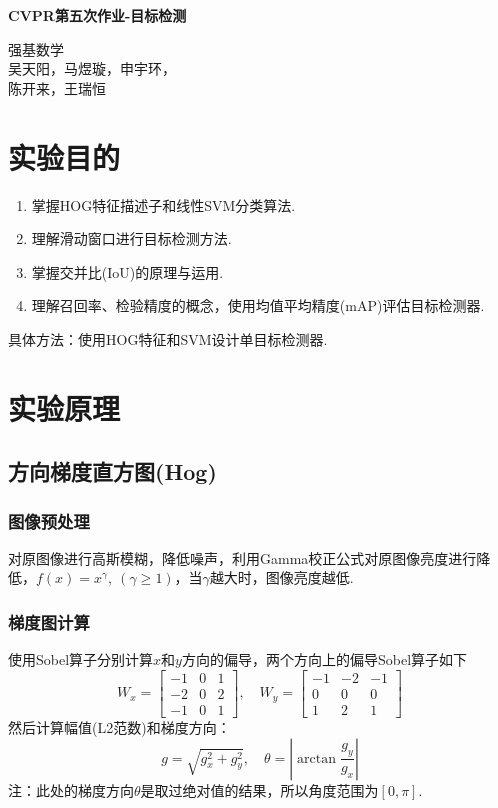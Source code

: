 \documentclass[12pt, a4paper, oneside]{ctexart}
\numberwithin{equation}{section}  %
\newenvironment{myTitle}[1]{
    \begin{center}
    {\zihao{-2}\bf #1\\}
    \zihao{-4}\it
}{\end{center}}  %
\let\geq=\geqslant %
\begin{document}
\begin{myTitle}{CVPR第五次作业-目标检测}
    强基数学\\
    吴天阳，马煜璇，申宇环，\\
    陈开来，王瑞恒
\end{myTitle}
\section{实验目的}
\begin{enumerate}
  \item 掌握HOG特征描述子和线性SVM分类算法.
  \item 理解滑动窗口进行目标检测方法.
  \item 掌握交并比(IoU)的原理与运用.
  \item 理解召回率、检验精度的概念，使用均值平均精度(mAP)评估目标检测器.
\end{enumerate}

具体方法：使用HOG特征和SVM设计单目标检测器.
\section{实验原理}
\subsection{方向梯度直方图(Hog)}
\subsubsection{图像预处理}
对原图像进行高斯模糊，降低噪声，利用Gamma校正公式对原图像亮度进行降低，$f(x) = x^{\gamma},\ (\gamma \geq 1)$，当$\gamma$越大时，图像亮度越低.
\subsubsection{梯度图计算}
使用Sobel算子分别计算$x$和$y$方向的偏导，两个方向上的偏导Sobel算子如下
\begin{equation*}
  W_x = \left[\begin{matrix}
    -1&0&1\\
    -2&0&2\\
    -1&0&1
  \end{matrix}\right],\quad W_y = \left[\begin{matrix}
    -1&-2&-1\\
    0&0&0\\
    1&2&1
  \end{matrix}\right]
\end{equation*}然后计算幅值(L2范数)和梯度方向：
\begin{equation*}
  g = \sqrt{g_x^2+g_y^2},\quad \theta = \left|\arctan\frac{g_y}{g_x}\right|
\end{equation*}
注：此处的梯度方向$\theta$是取过绝对值的结果，所以角度范围为$[0,\pi]$.
\end{document}
